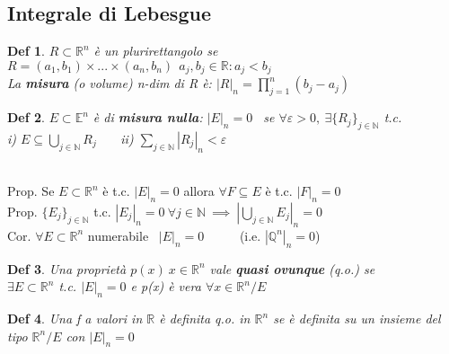 \documentclass{article}
\theoremstyle{unnumbered}
\newtheorem* {theoremT}{Def}
\theoremstyle{unnumbered1}
\newenvironment{defi}{\begin{gBox}\begin{theoremT}}{\end{theoremT}\end{gBox}}
\begin{document}
\subsection{Integrale di Lebesgue}
\begin{defi}
$R\subset\mathbb{R}^n$ è un plurirettangolo se $R=(a_1,b_1)\times...\times(a_n,b_n) \ \ a_j,b_j\in\mathbb{R} : a_j<b_j$ \\
La \textbf{misura} (o volume) n-dim di R è: $|R|_n=\prod_{j=1}^n(b_j-a_j)$
\end{defi}
\begin{defi}
$E\subset\mathbb{E}^n$ è di \textbf{misura nulla}: $|E|_n=0$ \ se $\forall\varepsilon>0, \ \exists\{R_j\}_{j\in\mathbb{N}}$ t.c.\\
i) $E\subseteq \bigcup_{j\in\mathbb{N}}R_j$ \ \ \ ii) $\sum_{j\in\mathbb{N}}|R_j|_n<\varepsilon$
\end{defi}
%
\phantom{}\\
%
Prop. Se $E\subset\mathbb{R}^n$ è t.c. $|E|_n=0$ allora $\forall F\subseteq E$ è t.c. $|F|_n=0$\\
%
Prop. $\{E_j\}_{j\in\mathbb{N}}$ t.c. $|E_j|_n=0 \ \forall j\in\mathbb{N} \ \implies \ |\bigcup_{j\in\mathbb{N}}E_j|_n=0$\\
%
Cor. $\forall E \subset \mathbb{R}^n$ numerabile \ $|E|_n=0$ \ \ \ \ \ (i.e. $|\mathbb{Q}^n|_n=0$)\\
%
\begin{defi}
Una proprietà $p(x) \ x \in \mathbb{R}^n$ vale \textbf{quasi ovunque} (q.o.) se\\ $\exists E \subset\mathbb{R}^n$ t.c. $|E|_n=0$ e p(x) è vera $\forall x\in\mathbb{R}^n/E$ 
\end{defi}

\begin{defi}
Una f a valori in $\mathbb{R}$ è definita q.o. in $\mathbb{R}^n$ se è definita su un insieme del tipo $\mathbb{R}^n/E$ con $|E|_n=0$
\end{defi}
\end{document}

